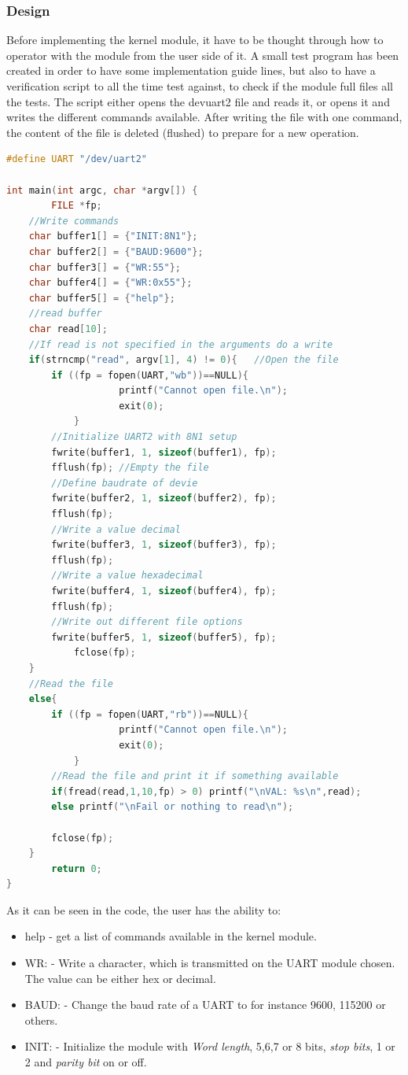 \subsubsection{Design}
Before implementing the kernel module, it have to be thought through how to operator with the module from the user side of it. A small test program has been created in order to have some implementation guide lines, but also to have a verification script to all the time test against, to check if the module full files all the tests. 
\p The script either opens the \/dev\/uart2 file and reads it, or opens it and writes the different commands available. After writing the file with one command, the content of the file is deleted (flushed) to prepare for a new operation. 
\begin{lstlisting}[language=c]
#define UART "/dev/uart2"

int main(int argc, char *argv[]) {
        FILE *fp;
	//Write commands
	char buffer1[] = {"INIT:8N1"};
	char buffer2[] = {"BAUD:9600"};
	char buffer3[] = {"WR:55"};
	char buffer4[] = {"WR:0x55"};
	char buffer5[] = {"help"};
	//read buffer
	char read[10];
	//If read is not specified in the arguments do a write
	if(strncmp("read", argv[1], 4) != 0){	//Open the file
		if ((fp = fopen(UART,"wb"))==NULL){
                	printf("Cannot open file.\n");
               	 	exit(0);
        	}
		//Initialize UART2 with 8N1 setup
		fwrite(buffer1, 1, sizeof(buffer1), fp);
		fflush(fp); //Empty the file
		//Define baudrate of devie
		fwrite(buffer2, 1, sizeof(buffer2), fp);
		fflush(fp);
		//Write a value decimal
 		fwrite(buffer3, 1, sizeof(buffer3), fp);
		fflush(fp);
		//Write a value hexadecimal
 		fwrite(buffer4, 1, sizeof(buffer4), fp);
		fflush(fp);
		//Write out different file options
 		fwrite(buffer5, 1, sizeof(buffer5), fp);
        	fclose(fp);
	}
	//Read the file
	else{
		if ((fp = fopen(UART,"rb"))==NULL){
                	printf("Cannot open file.\n");
               	 	exit(0);
        	}
		//Read the file and print it if something available
		if(fread(read,1,10,fp) > 0) printf("\nVAL: %s\n",read);
		else printf("\nFail or nothing to read\n");

		fclose(fp);
	}
        return 0;
}
\end{lstlisting}
As it can be seen in the code, the user has the ability to:
\begin{itemize}
	\item help - get a list of commands available in the kernel module.
	\item WR: - Write a character, which is transmitted on the UART module chosen. The value can be either hex or decimal.
	\item BAUD: - Change the baud rate of a UART to for instance 9600, 115200 or others.
	\item INIT: - Initialize the module with \textit{Word length}, 5,6,7 or 8 bits, \textit{stop bits}, 1 or 2 and \textit{parity bit} on or off. 
\end{itemize}
